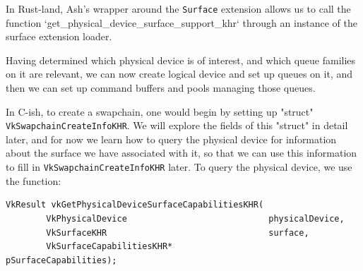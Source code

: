 \documentclass[12pt,letterpaper]{article}
\newcommand{\ril}[1]{\texttt{#1}}
\newcommand{\cil}[1]{\texttt{#1}}
\begin{document}
    In Rust-land, Ash's wrapper around the \ril{Surface} extension allows us to call the function `get_physical_device_surface_support_khr` through an instance of the surface extension loader.
    
    Having determined which physical device is of interest, and which queue families on it are relevant, we can now create logical device and set up queues on it, and then we can set up command buffers and pools managing those queues. 
    
	In C-ish, to create a swapchain, one would begin by setting up "struct" \cil{VkSwapchainCreateInfoKHR}. We will explore the fields of this "struct" in detail later, and for now we learn how to query the physical device for information about the surface we have associated with it, so that we can use this information to fill in \cil{VkSwapchainCreateInfoKHR} later. To query the physical device, we use the function:
        \begin{verbatim}
VkResult vkGetPhysicalDeviceSurfaceCapabilitiesKHR(
        VkPhysicalDevice                            physicalDevice,
        VkSurfaceKHR                                surface,
        VkSurfaceCapabilitiesKHR*                   pSurfaceCapabilities);
        \end{verbatim}
        
\end{document}
